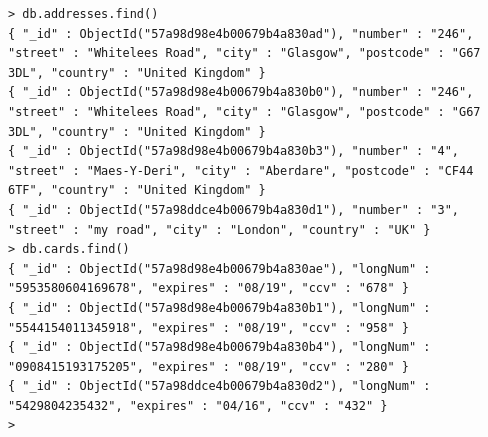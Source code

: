 \begin{lstlisting}
> db.addresses.find()
{ "_id" : ObjectId("57a98d98e4b00679b4a830ad"), "number" : "246", "street" : "Whitelees Road", "city" : "Glasgow", "postcode" : "G67 3DL", "country" : "United Kingdom" }
{ "_id" : ObjectId("57a98d98e4b00679b4a830b0"), "number" : "246", "street" : "Whitelees Road", "city" : "Glasgow", "postcode" : "G67 3DL", "country" : "United Kingdom" }
{ "_id" : ObjectId("57a98d98e4b00679b4a830b3"), "number" : "4", "street" : "Maes-Y-Deri", "city" : "Aberdare", "postcode" : "CF44 6TF", "country" : "United Kingdom" }
{ "_id" : ObjectId("57a98ddce4b00679b4a830d1"), "number" : "3", "street" : "my road", "city" : "London", "country" : "UK" }
> db.cards.find()
{ "_id" : ObjectId("57a98d98e4b00679b4a830ae"), "longNum" : "5953580604169678", "expires" : "08/19", "ccv" : "678" }
{ "_id" : ObjectId("57a98d98e4b00679b4a830b1"), "longNum" : "5544154011345918", "expires" : "08/19", "ccv" : "958" }
{ "_id" : ObjectId("57a98d98e4b00679b4a830b4"), "longNum" : "0908415193175205", "expires" : "08/19", "ccv" : "280" }
{ "_id" : ObjectId("57a98ddce4b00679b4a830d2"), "longNum" : "5429804235432", "expires" : "04/16", "ccv" : "432" }
>
\end{lstlisting}

